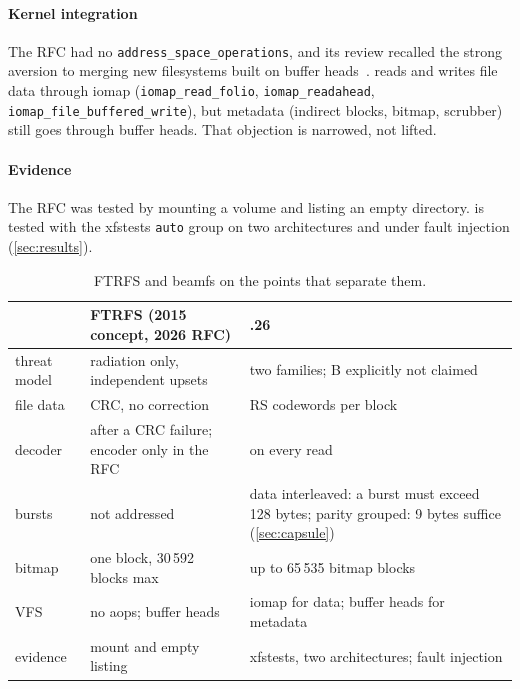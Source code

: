 \paragraph*{Kernel integration}
The RFC had no \texttt{address\_space\_operations}, and its review
recalled the strong aversion to merging new filesystems built on buffer
heads~\cite{ftrfsrfc}. \bfs reads and writes file data through iomap
(\texttt{iomap\_read\_folio}, \texttt{iomap\_readahead},
\texttt{iomap\_file\_buffered\_write}), but metadata (indirect blocks,
bitmap, scrubber) still goes through buffer heads. That objection is
narrowed, not lifted.

\paragraph*{Evidence}
The RFC was tested by mounting a volume and listing an empty directory.
\bfs is tested with the xfstests \texttt{auto} group on two
architectures and under fault injection (\cref{sec:results}).

\begin{table}[t]
\centering
\caption{FTRFS and beamfs on the points that separate them.}
\label{tab:ftrfs}
\footnotesize
\begin{tabularx}{\columnwidth}{@{}>{\raggedright\arraybackslash}p{1.45cm}
  >{\raggedright\arraybackslash}X >{\raggedright\arraybackslash}X@{}}
\toprule
 & FTRFS (2015 concept, 2026 RFC) & \bfs 0.1.26 \\
\midrule
threat model & radiation only, independent upsets &
  two families; B explicitly not claimed \\
file data & CRC, no correction & 16 RS codewords per block \\
decoder & after a CRC failure; encoder only in the RFC &
  on every read \\
bursts & not addressed & data interleaved: a burst must exceed
  128 bytes; parity grouped: 9 bytes suffice (\cref{sec:capsule}) \\
bitmap & one block, 30\,592 blocks max & up to 65\,535 bitmap blocks \\
VFS & no aops; buffer heads & iomap for data; buffer heads for metadata \\
evidence & mount and empty listing & xfstests, two architectures;
  fault injection \\
\bottomrule
\end{tabularx}
\end{table}
